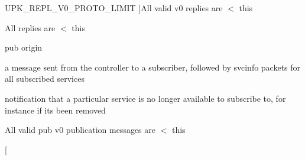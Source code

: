 \begin{Desc}
\begin{description}
{UPK\_\-REPL\_\-V0\_\-PROTO\_\-LIMIT\label{group__client__protocol_gab04f5fc5314f6296f0ef4b171d1b4282a2eb1a2fa31ca50bb78d16ce51c2c4524}
}]All valid v0 replies are $<$ this \item[{\em 
UPK\_\-REPL\_\-LIMIT\label{group__client__protocol_gab04f5fc5314f6296f0ef4b171d1b4282a02e71af273f9b7092b8cc2f782f3da5e}
}]All replies are $<$ this \item[{\em 
UPK\_\-PUB\_\-ORIGIN\label{group__client__protocol_gab04f5fc5314f6296f0ef4b171d1b4282a64e55f7bd2b88ea1d929a5e158b0a64b}
}]pub origin \item[{\em 
UPK\_\-PUB\_\-PUBLICATION\label{group__client__protocol_gab04f5fc5314f6296f0ef4b171d1b4282a0aca3ba5b1fdb79e07fb737421a3de5e}
}]a message sent from the controller to a subscriber, followed by svcinfo packets for all subscribed services \item[{\em 
UPK\_\-PUB\_\-CANCELATION\label{group__client__protocol_gab04f5fc5314f6296f0ef4b171d1b4282a3bbda7fcc6c4d7fc4a103003f65a8785}
}]notification that a particular service is no longer available to subscribe to, for instance if its been removed \item[{\em 
UPK\_\-PUB\_\-V0\_\-PROTO\_\-LIMIT\label{group__client__protocol_gab04f5fc5314f6296f0ef4b171d1b4282a6c36a01a04deabca901ce631c8975f52}
}]All valid pub v0 publication messages are $<$ this \item[{\em 
}
\end{description}
\end{Desc}
